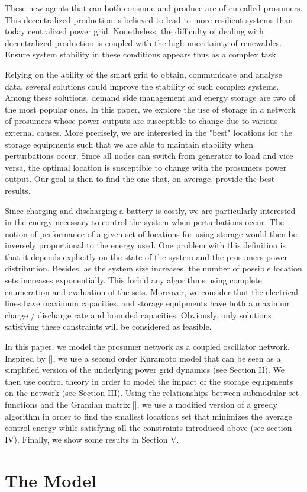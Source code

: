 \documentclass[10pt,twoside%
                ,draft%
        ]{article}
\begin{document}
These new agents that can both consume and produce are often called prosumers. This decentralized production is believed to lead to more resilient systems than today centralized power grid. Nonetheless, the difficulty of dealing with decentralized production is coupled with the high uncertainty of renewables. Ensure system stability in these conditions appears thus as a complex task. 

Relying on the ability of the smart grid to obtain, communicate and analyse data, several solutions could  improve the stability of such complex systems. Among these solutions, demand side management and energy storage are two of the most popular ones. In this paper, we explore the use of storage in a network of prosumers whose power outputs are susceptible to change due to various external causes. More precisely, we are interested in the "best" locations for the storage equipments such that we are able to maintain stability when  perturbations occur. Since all nodes can switch from generator to load and vice versa, the optimal location is susceptible to change with the prosumers power output.
Our goal is then to find the one that, on average, provide the best results.

Since charging and discharging a battery is costly, we are particularly interested in the energy necessary to control the system when perturbations occur. The notion of performance of a given set of locations for using storage would then be inversely proportional to the energy used. One problem with this definition is that it depends explicitly on the state of the system and the prosumers power distribution. Besides, as the system size increases, the number of possible location sets increases exponentially. This forbid any algorithms using complete enumeration and evaluation of the sets.
Moreover, we consider  that the electrical lines have maximum capacities, and storage equipments have both a maximum charge / discharge rate and  bounded capacities. Obviously, only solutions satisfying these constraints will be considered as feasible.



 In this paper, we model the prosumer network as a coupled oscillator network. Inspired by [], we use a second order Kuramoto model that can be seen as a simplified version of the underlying power grid dynamics (see Section II). We then use control theory in order to model the impact of the storage equipments on the network (see Section III). Using the relationships between submodular set functions
and the Gramian matrix [], we use a modified version of a greedy algorithm in order to find the smallest locations set that minimizes the average control energy while satisfying all the constraints introduced above (see section IV).
Finally, we show some results in Section V.\section{The Model}
\end{document}
